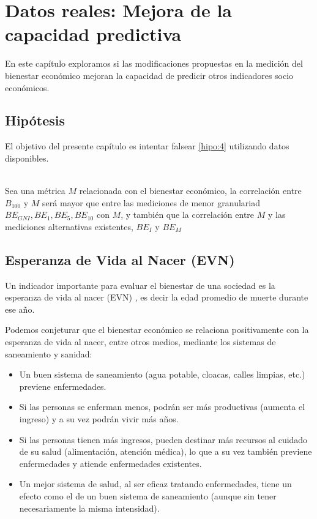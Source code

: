 \chapter{Datos reales: Mejora de la capacidad predictiva} \label{chapter:datos_reales_otros_indicadores}

En este capítulo exploramos si las modificaciones propuestas en la medición del bienestar económico mejoran la capacidad de predicir otros indicadores socio económicos.

\section{Hipótesis}

El objetivo del presente capítulo es intentar falsear \ref{hipo:4} utilizando datos disponibles.

\begin{hipotesis}\label{hipo:4}
    \\
    Sea una métrica $M$ relacionada con el bienestar económico, la correlación entre $B_{100}$ y $M$ será mayor que entre las mediciones de menor granulariad $BE_{GNI}, BE_1, BE_5, BE_{10}$ con $M$, y también que la correlación entre $M$ y las mediciones alternativas existentes, $BE_I$ y $BE_M$
\end{hipotesis}


\section{Esperanza de Vida al Nacer (EVN)} \label{section:esperanza_vida_nacer}

Un indicador importante para evaluar el bienestar de una sociedad es la esperanza de vida al nacer (EVN) \cite{worldbank_health_data}, es decir la edad promedio de muerte durante ese año. 

Podemos conjeturar que el bienestar económico se relaciona positivamente con la esperanza de vida al nacer, entre otros medios, mediante los sistemas de saneamiento y sanidad:

\begin{itemize}
    \item Un buen sistema de saneamiento (agua potable, cloacas, calles limpias, etc.) previene enfermedades.
    \item Si las personas se enferman menos, podrán ser más productivas (aumenta el ingreso) y a su vez podrán vivir más años.
    \item Si las personas tienen más ingresos, pueden destinar más recursos al cuidado de su salud (alimentación, atención médica), lo que a su vez también previene enfermedades y atiende enfermedades existentes.
    \item Un mejor sistema de salud, al ser eficaz tratando enfermedades, tiene un efecto como el de un buen sistema de saneamiento (aunque sin tener necesariamente la misma intensidad).
\end{itemize}

